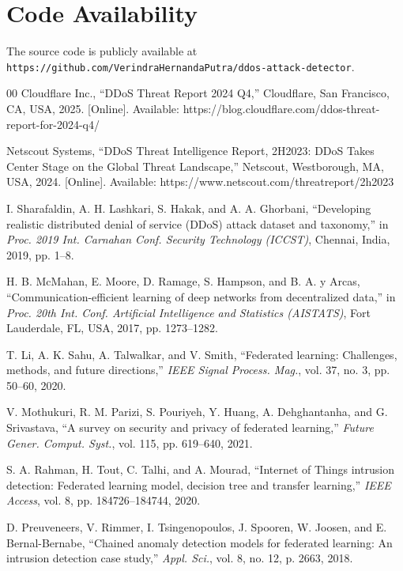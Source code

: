 \documentclass[conference, a4paper]{IEEEtran}
\begin{document}
\section*{Code Availability}
The source code is publicly available at \texttt{https://github.com/VerindraHernandaPutra/ddos-attack-detector}.

\begin{thebibliography}{00}
 Cloudflare Inc., ``DDoS Threat Report 2024 Q4,'' Cloudflare, San Francisco, CA, USA, 2025. [Online]. Available: https://blog.cloudflare.com/ddos-threat-report-for-2024-q4/

 Netscout Systems, ``DDoS Threat Intelligence Report, 2H2023: DDoS Takes Center Stage on the Global Threat Landscape,'' Netscout, Westborough, MA, USA, 2024. [Online]. Available: https://www.netscout.com/threatreport/2h2023

 I. Sharafaldin, A. H. Lashkari, S. Hakak, and A. A. Ghorbani, ``Developing realistic distributed denial of service (DDoS) attack dataset and taxonomy,'' in \textit{Proc. 2019 Int. Carnahan Conf. Security Technology (ICCST)}, Chennai, India, 2019, pp. 1--8.

 H. B. McMahan, E. Moore, D. Ramage, S. Hampson, and B. A. y Arcas, ``Communication-efficient learning of deep networks from decentralized data,'' in \textit{Proc. 20th Int. Conf. Artificial Intelligence and Statistics (AISTATS)}, Fort Lauderdale, FL, USA, 2017, pp. 1273--1282.

 T. Li, A. K. Sahu, A. Talwalkar, and V. Smith, ``Federated learning: Challenges, methods, and future directions,'' \textit{IEEE Signal Process. Mag.}, vol. 37, no. 3, pp. 50--60, 2020.

 V. Mothukuri, R. M. Parizi, S. Pouriyeh, Y. Huang, A. Dehghantanha, and G. Srivastava, ``A survey on security and privacy of federated learning,'' \textit{Future Gener. Comput. Syst.}, vol. 115, pp. 619--640, 2021.

 S. A. Rahman, H. Tout, C. Talhi, and A. Mourad, ``Internet of Things intrusion detection: Federated learning model, decision tree and transfer learning,'' \textit{IEEE Access}, vol. 8, pp. 184726--184744, 2020.

 D. Preuveneers, V. Rimmer, I. Tsingenopoulos, J. Spooren, W. Joosen, and E. Bernal-Bernabe, ``Chained anomaly detection models for federated learning: An intrusion detection case study,'' \textit{Appl. Sci.}, vol. 8, no. 12, p. 2663, 2018.


\end{thebibliography}
\end{document}
